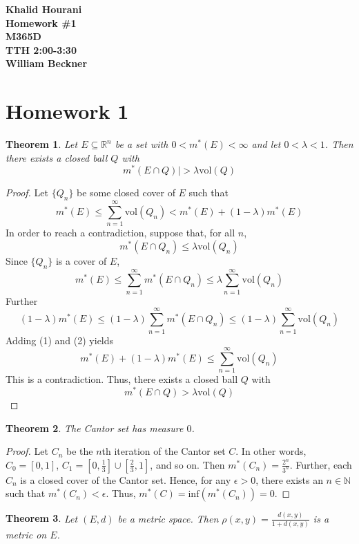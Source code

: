 \documentclass[12pt,leqno]{article}
\numberwithin{equation}{section}
\newtheorem{thm}{Theorem}[section]
\theoremstyle{definition}
\begin{document}
\thispagestyle{plain}
\begin{flushright}
\large{\textbf{Khalid Hourani\\
Homework \#1\\
M365D\\
TTH 2:00-3:30\\
William Beckner\\}}
\end{flushright}
\section{Homework 1}
\begin{thm}
Let $E\subseteq\mathbb{R}^n$ be a set with $0<m^*(E)<\infty$ and let $0<\lambda<1$. Then
there exists a closed ball $Q$ with \[m^*(E\cap Q)|>\lambda\text{vol}(Q)\]
\end{thm}


\begin{proof}
Let $\{Q_n\}$ be some closed cover of $E$ such that \[m^*(E)\leq\sum_{n=1}^{\infty}\text{vol}(Q_n)<m^*(E)+(1-\lambda)m^*(E)\]In order to reach a contradiction, suppose that, for all $n$, \[m^*(E\cap Q_n)\leq\lambda\text{vol}(Q_n)\]Since $\{Q_n\}$ is a cover of $E$, \[\tag{1}m^*(E)\leq\sum_{n=1}^{\infty}m^*(E\cap Q_n)\leq\lambda\sum_{n=1}^{\infty}\text{vol}(Q_n)\]Further \[\tag{2}(1-\lambda)m^*(E)\leq(1-\lambda)\sum_{n=1}^{\infty}m^*(E\cap Q_n)\leq(1-\lambda)\sum_{n=1}^{\infty}\text{vol}(Q_n)\]Adding (1) and (2) yields\[m^*(E)+(1-\lambda)m^*(E)\leq\sum_{n=1}^{\infty}\text{vol}(Q_n)\] This is a contradiction. Thus, there exists a closed ball $Q$ with \[m^*(E\cap Q)>\lambda\text{vol}(Q)\]
\end{proof}

\begin{thm}
 The Cantor set has measure $0$.
\end{thm}

\begin{proof}
 Let $C_n$ be the $n$th iteration of the Cantor set $C$. In other words, $C_0=[0,1]$, $C_1=[0,\frac{1}{3}]\cup[\frac{2}{3},1]$, and so on. Then $m^*(C_n)=\frac{2^n}{3^n}$. Further, each $C_n$ is a closed cover of the Cantor set. Hence, for any $\epsilon>0$, there exists an $n\in\mathbb{N}$ such that $m^*(C_n)<\epsilon$. Thus, $m^*(C)=\text{inf}\left(m^*(C_n)\right)=0$.
\end{proof}

\begin{thm}
 Let $(E,d)$ be a metric space. Then $\rho(x,y)=\frac{d(x,y)}{1+d(x,y)}$ is a metric on $E$.
\end{thm}
\end{document}
